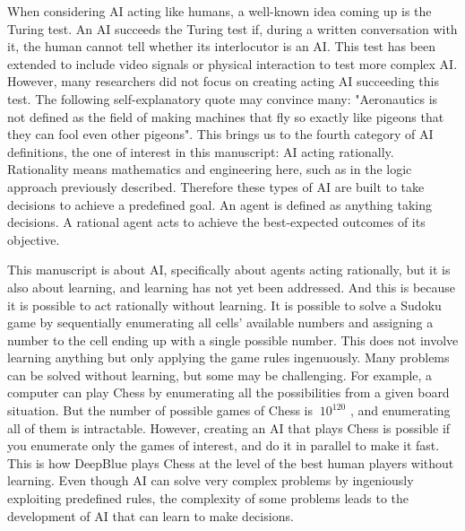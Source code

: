 When considering AI acting like humans, a well-known idea coming up is the Turing test.
An AI succeeds the Turing test if, during a written conversation with it, the human cannot tell whether its interlocutor is an AI.
This test has been extended to include video signals or physical interaction to test more complex AI.
However, many researchers did not focus on creating acting AI succeeding this test.
The following self-explanatory quote may convince many: "Aeronautics is not defined as the field of making machines that fly so exactly like pigeons that they can fool even other pigeons"\citep{russel2010}.
This brings us to the fourth category of AI definitions, the one of interest in this manuscript: AI acting rationally.
Rationality means mathematics and engineering here, such as in the logic approach previously described.
Therefore these types of AI are built to take decisions to achieve a predefined goal.
An agent is defined as anything taking decisions.
A rational agent acts to achieve the best-expected outcomes of its objective.

This manuscript is about AI, specifically about agents acting rationally, but it is also about learning, and learning has not yet been addressed.
And this is because it is possible to act rationally without learning.
It is possible to solve a Sudoku game by sequentially enumerating all cells' available numbers and assigning a number to the cell ending up with a single possible number.
This does not involve learning anything but only applying the game rules ingenuously.
Many problems can be solved without learning, but some may be challenging.
For example, a computer can play Chess by enumerating all the possibilities from a given board situation.
But the number of possible games of Chess is $~10^{120}$ \citep{shannon1950xxii}, and enumerating all of them is intractable.
However, creating an AI that plays Chess is possible if you enumerate only the games of interest, and do it in parallel to make it fast.
This is how DeepBlue \citep{campbell2002deep} plays Chess at the level of the best human players without learning.
Even though AI can solve very complex problems by ingeniously exploiting predefined rules, the complexity of some problems leads to the development of AI that can learn to make decisions.

